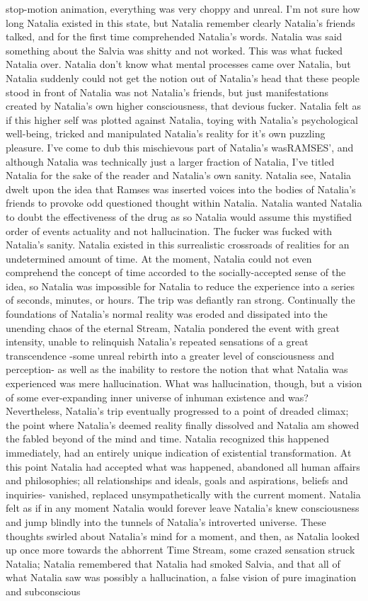 \documentclass[12pt]{book}
\begin{document}
stop-motion animation, everything was very choppy and unreal. I'm not sure how long Natalia existed in this state, but Natalia remember clearly Natalia's friends talked, and for the first time comprehended Natalia's words. Natalia was said something about the Salvia was shitty and not worked. This was what fucked Natalia over. Natalia don't know what mental processes came over Natalia, but Natalia suddenly could not get the notion out of Natalia's head that these people stood in front of Natalia was not Natalia's friends, but just manifestations created by Natalia's own higher consciousness, that devious fucker. Natalia felt as if this higher self was plotted against Natalia, toying with Natalia's psychological well-being, tricked and manipulated Natalia's reality for it's own puzzling pleasure. I've come to dub this mischievous part of Natalia's wasRAMSES', and although Natalia was technically just a larger fraction of Natalia, I've titled Natalia for the sake of the reader and Natalia's own sanity. Natalia see, Natalia dwelt upon the idea that Ramses was inserted voices into the bodies of Natalia's friends to provoke odd questioned thought within Natalia. Natalia wanted Natalia to doubt the effectiveness of the drug as so Natalia would assume this mystified order of events actuality and not hallucination. The fucker was fucked with Natalia's sanity. Natalia existed in this surrealistic crossroads of realities for an undetermined amount of time. At the moment, Natalia could not even comprehend the concept of time accorded to the socially-accepted sense of the idea, so Natalia was impossible for Natalia to reduce the experience into a series of seconds, minutes, or hours. The trip was defiantly ran strong. Continually the foundations of Natalia's normal reality was eroded and dissipated into the unending chaos of the eternal Stream, Natalia pondered the event with great intensity, unable to relinquish Natalia's repeated sensations of a great transcendence -some unreal rebirth into a greater level of consciousness and perception- as well as the inability to restore the notion that what Natalia was experienced was mere hallucination. What was hallucination, though, but a vision of some ever-expanding inner universe of inhuman existence and was? Nevertheless, Natalia's trip eventually progressed to a point of dreaded climax; the point where Natalia's deemed reality finally dissolved and Natalia am showed the fabled beyond of the mind and time. Natalia recognized this happened immediately, had an entirely unique indication of existential transformation. At this point Natalia had accepted what was happened, abandoned all human affairs and philosophies; all relationships and ideals, goals and aspirations, beliefs and inquiries- vanished, replaced unsympathetically with the current moment. Natalia felt as if in any moment Natalia would forever leave Natalia's knew consciousness and jump blindly into the tunnels of Natalia's introverted universe. These thoughts swirled about Natalia's mind for a moment, and then, as Natalia looked up once more towards the abhorrent Time Stream, some crazed sensation struck Natalia; Natalia remembered that Natalia had smoked Salvia, and that all of what Natalia saw was possibly a hallucination, a false vision of pure imagination and subconscious 
\end{document}
